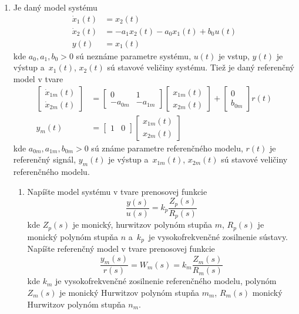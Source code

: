 \documentclass[a4paper, 10pt, ]{article}
\begin{document}
\begin{enumerate}



    \item Je daný model systému
    \begin{align*}
        \dot{x}_1(t) &= x_2(t) \\
        \dot{x}_2(t) &= -a_1 x_2(t) - a_0 x_1(t) + b_0 u(t) \\
        y(t) & = x_1(t)
    \end{align*}
    kde $a_0, a_1, b_0 > 0$ sú neznáme parametre systému, $u(t)$ je vstup, $y(t)$ je výstup a~$x_1(t)$, $x_2(t)$ sú stavové veličiny systému. Tiež je daný referenčný model v tvare
    \begin{align*}
        \begin{bmatrix} \dot{x}_{1m}(t) \\ \dot{x}_{2m}(t) \end{bmatrix}
        &=
        \begin{bmatrix} 0 & 1 \\ -a_{0m} & -a_{1m} \end{bmatrix}
        \begin{bmatrix} x_{1m}(t)  \\ x_{2m}(t) \end{bmatrix}
        +
        \begin{bmatrix} 0  \\  b_{0m} \end{bmatrix}
        r(t) \\
        y_m(t) &= \begin{bmatrix} 1 & 0 \end{bmatrix}
        \begin{bmatrix} x_{1m}(t) \\ x_{2m}(t) \end{bmatrix}
    \end{align*}
    kde $a_{0m}, a_{1m}, b_{0m} > 0$ sú známe parametre referenčného modelu, $r(t)$ je referenčný signál, $y_m(t)$ je výstup a~$x_{1m}(t)$, $x_{2m}(t)$ sú stavové veličiny referenčného modelu.
    \begin{enumerate}
        \item Napíšte model systému v tvare prenosovej funkcie \label{odvodtePrenosFcn}
        \begin{equation*}
            \frac{y(s)}{u(s)} = k_p \frac{Z_p(s)}{R_p(s)}
        \end{equation*}
        kde $Z_p(s)$ je monický, hurwitzov polynóm stupňa $m$, $R_p(s)$ je monický polynóm stupňa $n$ a~$k_p$~je vysokofrekvenčné zosilnenie sústavy. Napíšte referenčný model v tvare prenosovej funkcie
        \begin{equation*}
            \frac{y_m(s)}{r(s)} = W_m(s) = k_m \frac{Z_m(s)}{R_m(s)}
        \end{equation*}
        kde $k_m$ je vysokofrekvenčné zosilnenie referenčného modelu, polynóm $Z_m(s)$ je monický Hurwitzov polynóm stupňa $m_m$, $R_m(s)$ monický Hurwitzov polynóm stupňa $n_m$.


\end{enumerate}
\end{enumerate}
\end{document}
